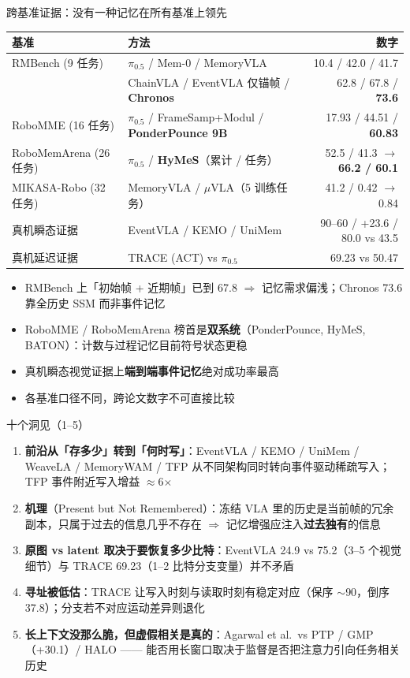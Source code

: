 \documentclass[aspectratio=169,10pt]{beamer}
\newcommand{\con}[1]{\textcolor{negative}{#1}}
\newcommand{\HL}[1]{\textcolor{emphasis}{\textbf{#1}}}
\begin{document}
\begin{frame}{跨基准证据：没有一种记忆在所有基准上领先}
\begin{center}
\small
\begin{tabular}{@{}llr@{}}
\toprule
基准 & 方法 & 数字 \\
\midrule
RMBench (9 任务) & $\pi_{0.5}$ / Mem-0 / MemoryVLA & 10.4 / 42.0 / 41.7 \\
 & ChainVLA / EventVLA 仅锚帧 / \textbf{Chronos} & 62.8 / 67.8 / \textbf{73.6} \\
RoboMME (16 任务) & $\pi_{0.5}$ / FrameSamp+Modul / \textbf{PonderPounce 9B} & 17.93 / 44.51 / \textbf{60.83} \\
RoboMemArena (26 任务) & $\pi_{0.5}$ / \textbf{HyMeS}（累计 / 任务） & 52.5 / 41.3 $\to$ \textbf{66.2 / 60.1} \\
MIKASA-Robo (32 任务) & MemoryVLA / $\mu$VLA（5 训练任务） & 41.2 / 0.42 $\to$ 0.84 \\
真机瞬态证据 & EventVLA / KEMO / UniMem & 90--60 / +23.6 / 80.0 vs 43.5 \\
真机延迟证据 & TRACE (ACT) vs $\pi_{0.5}$ & 69.23 vs 50.47 \\
\bottomrule
\end{tabular}
\end{center}
\vspace{2pt}
\begin{itemize}
\item RMBench 上「初始帧 + 近期帧」已到 67.8 $\Rightarrow$ 记忆需求偏浅；Chronos 73.6 靠全历史 SSM 而非事件记忆
\item RoboMME / RoboMemArena 榜首是\HL{双系统}（PonderPounce, HyMeS, BATON）：计数与过程记忆目前符号状态更稳
\item 真机瞬态视觉证据上\HL{端到端事件记忆}绝对成功率最高
\item 各基准口径不同，跨论文数字\con{不可直接比较}
\end{itemize}
\end{frame}

\begin{frame}{十个洞见（1--5）}
\begin{enumerate}
\item \textbf{前沿从「存多少」转到「何时写」}：EventVLA / KEMO / UniMem / WeaveLA / MemoryWAM / TFP 从不同架构同时转向事件驱动稀疏写入；TFP 事件附近写入增益 $\approx$6$\times$
\item \textbf{机理}（Present but Not Remembered）：冻结 VLA 里的历史是当前帧的\con{冗余副本}，只属于过去的信息几乎不存在 $\Rightarrow$ 记忆增强应注入\HL{过去独有}的信息
\item \textbf{原图 vs latent 取决于要恢复多少比特}：EventVLA 24.9 vs 75.2（3--5 个视觉细节）与 TRACE 69.23（1--2 比特分支变量）并不矛盾
\item \textbf{寻址被低估}：TRACE 让写入时刻与读取时刻有稳定对应（保序 $\sim$90，倒序 37.8）；分支若不对应运动差异则退化
\item \textbf{长上下文没那么脆，但虚假相关是真的}：Agarwal et al.\ vs PTP / GMP（+30.1）/ HALO —— 能否用长窗口取决于监督是否把注意力引向任务相关历史
\end{enumerate}
\end{frame}
\end{document}
